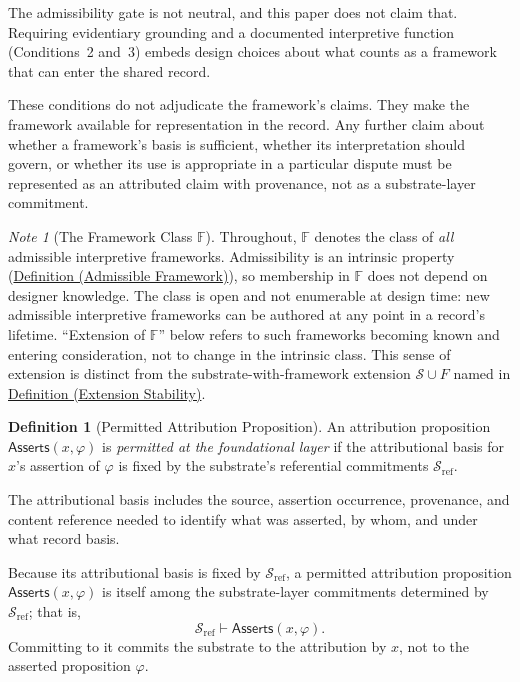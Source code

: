 \documentclass[11pt]{article}
\theoremstyle{plain}
\theoremstyle{definition}
\newtheorem{definition}[theorem]{Definition}
\theoremstyle{remark}
\newtheorem{note}[theorem]{Note}
\newcommand{\DefRef}[2]{\hyperref[#1]{Definition (#2)}}
\newcommand{\Substrate}{\mathcal{S}}
\newcommand{\SubstrateRef}{\mathcal{S}_{\mathrm{ref}}}
\newcommand{\Frameworks}{\mathbb{F}}
\newcommand{\Framework}{F}
\newcommand{\entails}{\vdash}
\newcommand{\Asserts}{\mathsf{Asserts}}
\begin{document}
The admissibility gate is not neutral, and this paper does not claim that.
Requiring evidentiary grounding and a documented interpretive function
(Conditions~2 and~3) embeds design choices about what counts as
a framework that can enter the shared record.

These conditions do not adjudicate the framework's claims.
They make the framework available for representation in the record.
Any further claim about whether a framework's basis is sufficient,
whether its interpretation should govern,
or whether its use is appropriate in a particular dispute
must be represented as an attributed claim with provenance,
not as a substrate-layer commitment.

\begin{note}[The Framework Class $\Frameworks$]
  \label{se100.note.FrameworkClass}
  Throughout, $\Frameworks$ denotes the
  class of \emph{all} admissible interpretive frameworks.
  Admissibility is an intrinsic property
  (\DefRef{se100.def.AdmissibleFramework}{Admissible Framework}),
  so membership in $\Frameworks$ does not depend on designer knowledge.
  The class is open and not enumerable at design time:
  new admissible interpretive frameworks can be authored at any
  point in a record's lifetime.
  ``Extension of $\Frameworks$'' below refers to
  such frameworks becoming known and entering consideration,
  not to change in the intrinsic class.
  This sense of extension is distinct from the
  substrate-with-framework extension $\Substrate \cup \Framework$ named in
  \DefRef{se100.def.ExtensionStability}{Extension Stability}.
\end{note}

\begin{definition}[Permitted Attribution Proposition]
  \label{se100.def.PermittedAttributionProposition}
  An attribution proposition $\Asserts(x,\varphi)$ is
  \emph{permitted at the foundational layer} if the attributional basis for
  $x$'s assertion of $\varphi$ is fixed by the substrate's referential
  commitments $\SubstrateRef$.

  The attributional basis includes the source, assertion occurrence,
  provenance, and content reference needed to identify what was asserted,
  by whom, and under what record basis.

  Because its attributional basis is fixed by $\SubstrateRef$,
  a permitted attribution proposition $\Asserts(x,\varphi)$ is itself among the
  substrate-layer commitments determined by $\SubstrateRef$; that is,
  \[
    \SubstrateRef \entails \Asserts(x,\varphi) .
  \]
  Committing to it commits the substrate to the attribution by $x$,
  not to the asserted proposition $\varphi$.
\end{definition}
\end{document}

